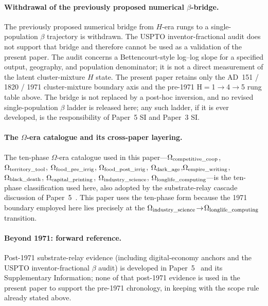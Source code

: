 \paragraph{Withdrawal of the previously proposed numerical \(\beta\)-bridge.}
The previously proposed numerical bridge from \(H\)-era rungs to a single-population \(\beta\) trajectory is withdrawn. The USPTO inventor-fractional audit does not support that bridge and therefore cannot be used as a validation of the present paper. The audit concerns a Bettencourt-style log--log slope for a specified output, geography, and population denominator; it is not a direct measurement of the latent cluster-mixture \(H\) state. The present paper retains only the AD~151 / 1820 / 1971 cluster-mixture boundary axis and the pre-1971 H${=}$1$\to$4$\to$5 rung table above. The bridge is not replaced by a post-hoc inversion, and no revised single-population \(\beta\) ladder is released here; any such ladder, if it is ever developed, is the responsibility of Paper~5 SI and Paper~3 SI.

\paragraph{The $\Omega$-era catalogue and its cross-paper layering.}
The ten-phase $\Omega$-era catalogue used in this paper---$\Omega_{\rm competitive\_coop}$, $\Omega_{\rm territory\_tool}$, $\Omega_{\rm food\_pre\_irrig}$, $\Omega_{\rm food\_post\_irrig}$, $\Omega_{\rm dark\_age}$,\linebreak $\Omega_{\rm empire\_writing}$, $\Omega_{\rm black\_death}$, $\Omega_{\rm capital\_printing}$, $\Omega_{\rm industry\_science}$, $\Omega_{\rm longlife\_computing}$---is the ten-phase classification used here, also adopted by the substrate-relay cascade discussion of Paper~5~\cite{Kato2026e}. This paper uses the ten-phase form because the 1971 boundary employed here lies precisely at the $\Omega_{\rm industry\_science}\!\to\!\Omega_{\rm longlife\_computing}$ transition.

\paragraph{Beyond 1971: forward reference.}
Post-1971 substrate-relay evidence (including digital-economy anchors and the USPTO inventor-fractional $\beta$ audit) is developed in Paper~5~\cite{Kato2026e} and its Supplementary Information; none of that post-1971 evidence is used in the present paper to support the pre-1971 chronology, in keeping with the scope rule already stated above.




